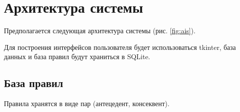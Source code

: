 \section{Архитектура системы}

Предполагается следующая архитектура системы (рис. \ref{fig:ais}).


Для построения интерфейсов пользователя будет использоваться tkinter, база данных и база правил будут храниться в SQLite.

\subsection{База правил}

Правила хранятся в виде пар (антецедент, консеквент).
